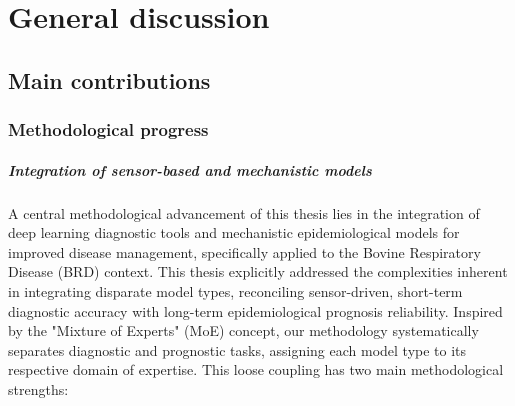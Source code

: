 
\chapter{General discussion} %

% 


\section{Main contributions}

\subsection{Methodological progress}



\paragraph{Integration of sensor-based and mechanistic models} A central methodological advancement of this thesis lies in the integration of deep learning diagnostic tools and mechanistic epidemiological models for improved disease management, specifically applied to the Bovine Respiratory Disease (BRD) context. This thesis explicitly addressed the complexities inherent in integrating disparate model types, reconciling sensor-driven, short-term diagnostic accuracy with long-term epidemiological prognosis reliability. Inspired by the "Mixture of Experts" (MoE) concept, our methodology systematically separates diagnostic and prognostic tasks, assigning each model type to its respective domain of expertise. This loose coupling has two main methodological strengths:

